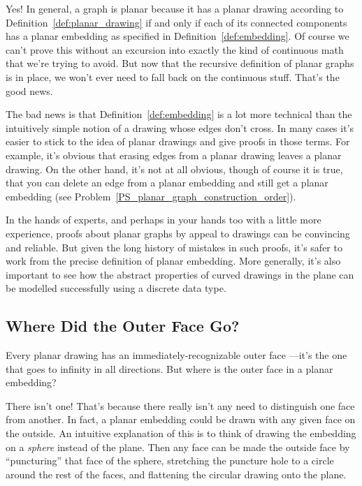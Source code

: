 Yes!  In general, a graph is planar because it has a planar drawing
according to Definition~\ref{def:planar_drawing} if and only if each
of its connected components has a planar embedding as specified in
Definition~\ref{def:embedding}.  Of course we can't prove this without
an excursion into exactly the kind of continuous math that we're
trying to avoid.  But now that the recursive definition of planar
graphs is in place, we won't ever need to fall back on the continuous
stuff.  That's the good news.

The bad news is that Definition~\ref{def:embedding} is a lot more
technical than the intuitively simple notion of a drawing whose edges
don't cross.  In many cases it's easier to stick to the idea of planar
drawings and give proofs in those terms.  For example, it's obvious
that erasing edges from a planar drawing leaves a planar drawing.  On
the other hand, it's not at all obvious, though of course it is true,
that you can delete an edge from a planar embedding and still get a
planar embedding (see
Problem~\ref{PS_planar_graph_construction_order}).

In the hands of experts, and perhaps in your hands too with a little
more experience, proofs about planar graphs by appeal to drawings can
be convincing and reliable.  But given the long history of mistakes in
such proofs, it's safer to work from the precise definition of planar
embedding.  More generally, it's also important to see how the
abstract properties of curved drawings in the plane can be modelled
successfully using a discrete data type.

\subsection{Where Did the Outer Face Go?}

Every planar drawing has an immediately-recognizable outer face
---it's the one that goes to infinity in all directions.  But where is
the outer face in a planar embedding?

There isn't one!  That's because there really isn't any need to
distinguish one face from another.  In fact, a planar embedding could
be drawn with any given face on the outside.  An intuitive explanation
of this is to think of drawing the embedding on a \emph{sphere}
instead of the plane.  Then any face can be made the outside face by
``puncturing'' that face of the sphere, stretching the puncture hole
to a circle around the rest of the faces, and flattening the circular
drawing onto the plane.

